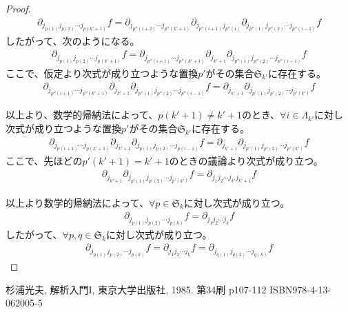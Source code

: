 \documentclass[dvipdfmx]{jsarticle}
\begin{document}
\begin{proof}
\begin{align*}
\partial_{j_{p(1)}j_{p(2)}\cdots j_{p\left( k' + 1 \right)}}f = \partial_{j_{p''(i + 2)}\cdots j_{p''\left( k' + 1 \right)}}\partial_{j_{p''(i + 1)}j_{p''(i)}}\partial_{j_{p''(1)}j_{p''(2)}\cdots j_{p''(i - 1)}}f
\end{align*}
したがって、次のようになる。
\begin{align*}
\partial_{j_{p(1)}j_{p(2)}\cdots j_{p\left( k' + 1 \right)}}f = \partial_{j_{p''(i + 1)}\cdots j_{p''\left( k' + 1 \right)}}\partial_{j_{k' + 1}}\partial_{j_{p''(1)}j_{p''(2)}\cdots j_{p''(i - 1)}}f
\end{align*}
ここで、仮定より次式が成り立つような置換$p'$がその集合$\mathfrak{S}_{k'}$に存在する。
\begin{align*}
\partial_{j_{p''(i + 1)}\cdots j_{p''\left( k' + 1 \right)}}\partial_{j_{k' + 1}}\partial_{j_{p''(1)}j_{p''(2)}\cdots j_{p''(i - 1)}}f = \partial_{j_{k' + 1}}\partial_{j_{p'(1)}j_{p'(2)}\cdots j_{p'\left( k' \right)}}f
\end{align*}\par
以上より、数学的帰納法によって、$p\left( k' + 1 \right) \neq k' + 1$のとき、$\forall i \in \varLambda_{k'}$に対し次式が成り立つような置換$p'$がその集合$\mathfrak{S}_{k'}$に存在する。
\begin{align*}
\partial_{j_{p(i + 1)}\cdots j_{p\left( k' + 1 \right)}}\partial_{j_{k' + 1}}\partial_{j_{p(1)}j_{p(2)}\cdots j_{p(i - 1)}}f = \partial_{j_{k' + 1}}\partial_{j_{p'(1)}j_{p'(2)}\cdots j_{p'\left( k' \right)}}f
\end{align*}
ここで、先ほどの$p'\left( k' + 1 \right) = k' + 1$のときの議論より次式が成り立つ。
\begin{align*}
\partial_{j_{k' + 1}}\partial_{j_{p'(1)}j_{p'(2)}\cdots j_{p'\left( k' \right)}}f = \partial_{j_{1}j_{2}\cdots j_{k'}j_{k' + 1}}f
\end{align*}\par
以上より数学的帰納法によって、$\forall p \in \mathfrak{S}_{k}$に対し次式が成り立つ。
\begin{align*}
\partial_{j_{p(1)}j_{p(2)}\cdots j_{p(k)}}f = \partial_{j_{1}j_{2}\cdots j_{k}}f
\end{align*}
したがって、$\forall p,q \in \mathfrak{S}_{k}に対し$次式が成り立つ。
\begin{align*}
\partial_{j_{p(1)}j_{p(2)}\cdots j_{p(k)}}f = \partial_{j_{1}j_{2}\cdots j_{k}}f = \partial_{j_{q(1)}j_{q(2)}\cdots j_{q(k)}}f
\end{align*}
\end{proof}
\begin{thebibliography}{50}
杉浦光夫, 解析入門I, 東京大学出版社, 1985. 第34刷 p107-112 ISBN978-4-13-062005-5
\end{thebibliography}
\end{document}
